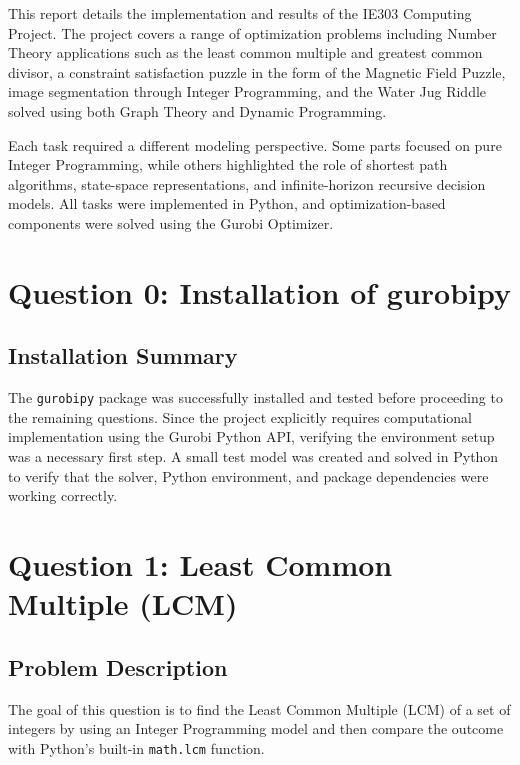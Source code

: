 \documentclass[11pt,a4paper]{article}
\begin{document}
This report details the implementation and results of the IE303 Computing Project. The project covers a range of optimization problems including Number Theory applications such as the least common multiple and greatest common divisor, a constraint satisfaction puzzle in the form of the Magnetic Field Puzzle, image segmentation through Integer Programming, and the Water Jug Riddle solved using both Graph Theory and Dynamic Programming.

Each task required a different modeling perspective. Some parts focused on pure Integer Programming, while others highlighted the role of shortest path algorithms, state-space representations, and infinite-horizon recursive decision models. All tasks were implemented in Python, and optimization-based components were solved using the Gurobi Optimizer.

\section*{Question 0: Installation of gurobipy}

\subsection*{Installation Summary}

The \texttt{gurobipy} package was successfully installed and tested before proceeding to the remaining questions. Since the project explicitly requires computational implementation using the Gurobi Python API, verifying the environment setup was a necessary first step. A small test model was created and solved in Python to verify that the solver, Python environment, and package dependencies were working correctly.

\section*{Question 1: Least Common Multiple (LCM)}

\subsection*{Problem Description}

The goal of this question is to find the Least Common Multiple (LCM) of a set of integers by using an Integer Programming model and then compare the outcome with Python's built-in \texttt{math.lcm} function.
\end{document}

